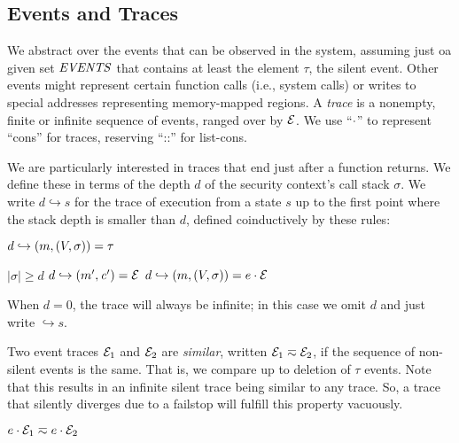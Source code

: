 \documentclass[10pt,conference]{ieeetran}%
\theoremstyle{definition}
\begin{document}
\subsection{Events and Traces}
\label{sec:events}

We abstract over the events that can be observed in the system, assuming just
oa given set \(\mathit{EVENTS}\) that contains at least the element \(\tau\), the silent
event. Other events might represent certain function calls (i.e., system calls)
or writes to special addresses representing memory-mapped regions.
A {\em trace} is a nonempty, finite or infinite sequence
of events, ranged over by \(\mathcal{E}\).
We use ``\(\cdot\)'' to represent ``cons'' for traces, reserving ``::''
for list-cons.

We are particularly interested in traces that end just after a function returns.
We define these in terms of the depth \(d\) of the security context's call stack \(\sigma\).
We write \(d \hookrightarrow s\) for the trace of execution from a state \(s\)
up to the first point where the stack depth is smaller than \(d\), defined
coinductively by these rules:

         {\(d \hookrightarrow (m,(V,\sigma)) = \tau\)}

              {\(|\sigma| \geq d\)}
              {\(d \hookrightarrow (m',\mathit{c}') = \mathcal{E}\)}
              {\(d \hookrightarrow (m,(V,\sigma)) = e \cdot \mathcal{E}\)}

\noindent
When \(d = 0\), the trace will always be infinite; in this case we
omit \(d\) and just write \(\hookrightarrow s\).

Two event traces $\mathcal{E}_1$ and $\mathcal{E}_2$ are {\em similar},
written \(\mathcal{E}_1 \eqsim \mathcal{E}_2\), if the sequence of non-silent events
is the same. That is, we compare up to deletion of \(\tau\) events.
Note that this results in an infinite silent trace being similar to
any trace. So, a trace that silently diverges due to a failstop  will
fulfill this property vacuously.

\begin{minipage}{.4\columnwidth}
  \judgment{}{\(\obsT \eqsim \obsT\)}
\end{minipage}
\begin{minipage}{.4\columnwidth}
           {\(e \cdot \mathcal{E}_1 \eqsim e \cdot \mathcal{E}_2\)}
\end{minipage}
\end{document}
